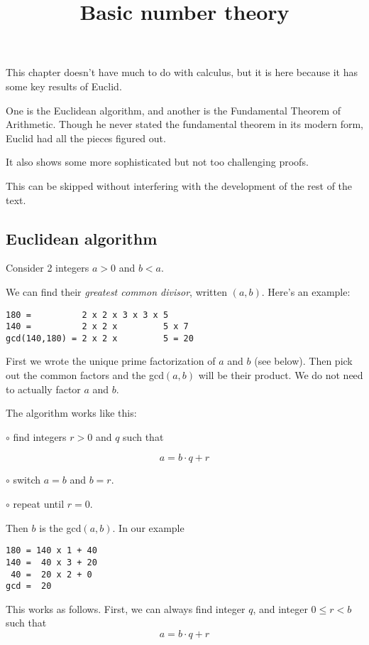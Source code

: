 \documentclass[11pt, oneside]{article}
\title{Basic number theory}
\date{}
\begin{document}
\maketitle
\Large

This chapter doesn't have much to do with calculus, but it is here because it has some key results of Euclid.

One is the Euclidean algorithm, and another is the Fundamental Theorem of Arithmetic.  Though he never stated the fundamental theorem in its modern form, Euclid had all the pieces figured out.  

It also shows some more sophisticated but not too challenging proofs.  

This can be skipped without interfering with the development of the rest of the text.

\subsection*{Euclidean algorithm}

Consider 2 integers $a > 0$ and $b < a$.  

We can find their \emph{greatest common divisor}, written $(a,b)$.  Here's an example:

\begin{verbatim}
180 =          2 x 2 x 3 x 3 x 5
140 =          2 x 2 x         5 x 7
gcd(140,180) = 2 x 2 x         5 = 20
\end{verbatim}

First we wrote the unique prime factorization of $a$ and $b$ (see below).  Then pick out the common factors and the gcd$(a,b)$ will be their product.  We do not need to actually factor $a$ and $b$.

The algorithm works like this:

$\circ$ find integers $r > 0$ and $q$ such that

\[ a = b \cdot q + r \]

$ \circ$ switch $a = b$ and $b = r$.

$ \circ$ repeat until $r = 0$.  

Then $b$ is the gcd$(a,b)$.  In our example

\begin{verbatim}
180 = 140 x 1 + 40
140 =  40 x 3 + 20
 40 =  20 x 2 + 0
gcd =  20
\end{verbatim}

This works as follows.  First, we can always find integer $q$, and integer $0 \le r < b$ such that
\[ a = b \cdot q + r \]
\end{document}
